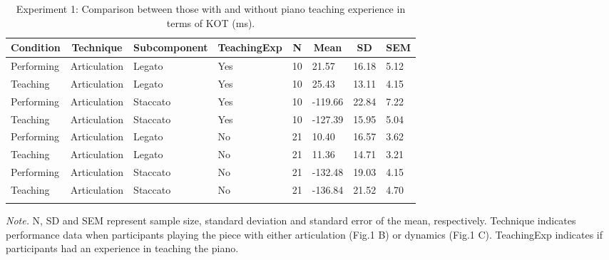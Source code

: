 \documentclass[
  man,floatsintext]{apa6}
\begin{document}
\begin{table}[tbp]

\begin{center}
\begin{threeparttable}

\caption{\label{tab:art-teaching-desc-1}Experiment 1: Comparison between those with and without piano teaching experience in terms of KOT (ms).}

\begin{tabular}{llllllll}
\toprule
Condition & \multicolumn{1}{c}{Technique} & \multicolumn{1}{c}{Subcomponent} & \multicolumn{1}{c}{TeachingExp} & \multicolumn{1}{c}{N} & \multicolumn{1}{c}{Mean} & \multicolumn{1}{c}{SD} & \multicolumn{1}{c}{SEM}\\
\midrule
Performing & Articulation & Legato & Yes & 10 & 21.57 & 16.18 & 5.12\\
Teaching & Articulation & Legato & Yes & 10 & 25.43 & 13.11 & 4.15\\
Performing & Articulation & Staccato & Yes & 10 & -119.66 & 22.84 & 7.22\\
Teaching & Articulation & Staccato & Yes & 10 & -127.39 & 15.95 & 5.04\\
Performing & Articulation & Legato & No & 21 & 10.40 & 16.57 & 3.62\\
Teaching & Articulation & Legato & No & 21 & 11.36 & 14.71 & 3.21\\
Performing & Articulation & Staccato & No & 21 & -132.48 & 19.03 & 4.15\\
Teaching & Articulation & Staccato & No & 21 & -136.84 & 21.52 & 4.70\\
\bottomrule
\addlinespace
\end{tabular}

\begin{tablenotes}[para]
\normalsize{\textit{Note.} N, SD and SEM represent sample size, standard deviation and standard error of the mean, respectively. Technique indicates performance data when participants playing the piece with either articulation (Fig.1 B) or dynamics (Fig.1 C). TeachingExp indicates if participants had an experience in teaching the piano.}
\end{tablenotes}

\end{threeparttable}
\end{center}

\end{table}
\end{document}
